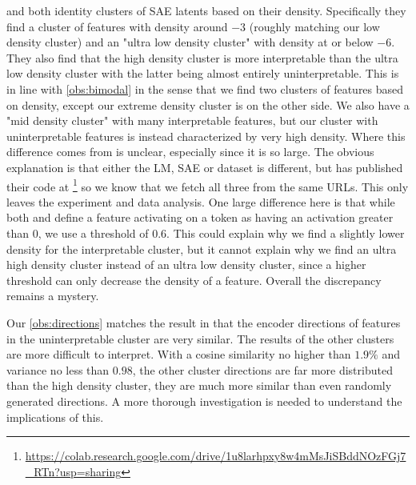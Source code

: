 \textcite{bricken_towards_2023} and \textcite{nanda_open_2023} both identity clusters of \ac{SAE} latents based on their density.
Specifically they find a cluster of features with density around $-3$ (roughly matching our low density cluster) and an "ultra low density cluster" with density at or below $-6$.
They also find that the high density cluster is more interpretable than the ultra low density cluster with the latter being almost entirely uninterpretable.
This is in line with \ref{obs:bimodal} in the sense that we find two clusters of features based on density, except our extreme density cluster is on the other side.
We also have a "mid density cluster" with many interpretable features, but our cluster with uninterpretable features is instead characterized by very high density.
Where this difference comes from is unclear, especially since it is so large.
The obvious explanation is that either the \ac{LM}, \ac{SAE} or dataset is different, but \textcite{nanda_open_2023} has published their code at \footnote{\url{https://colab.research.google.com/drive/1u8larhpxy8w4mMsJiSBddNOzFGj7_RTn?usp=sharing}} so we know that we fetch all three from the same URLs.
This only leaves the experiment and data analysis.
One large difference here is that while both \textcite{bricken_towards_2023} and \textcite{nanda_open_2023} define a feature activating on a token as having an activation greater than $0$, we use a threshold of $0.6$.
This could explain why we find a slightly lower density for the interpretable cluster, but it cannot explain why we find an ultra high density cluster instead of an ultra low density cluster, since a higher threshold can only decrease the density of a feature.
Overall the discrepancy remains a mystery.

Our \ref{obs:directions} matches the result in \textcite{nanda_open_2023} that the encoder directions of features in the uninterpretable cluster are very similar.
The results of the other clusters are more difficult to interpret.
With a cosine similarity no higher than $1.9\%$ and variance no less than $0.98$, the other cluster directions are far more distributed than the high density cluster, they are much more similar than even randomly generated directions.
A more thorough investigation is needed to understand the implications of this.


